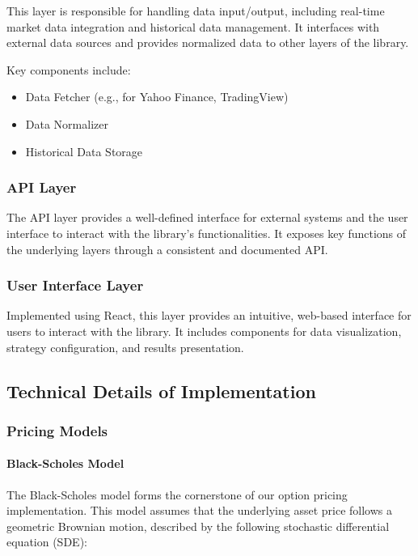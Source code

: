 \documentclass[12pt]{article}
\begin{document}
This layer is responsible for handling data input/output, including real-time market data integration and historical data management. It interfaces with external data sources and provides normalized data to other layers of the library.

Key components include:

\begin{itemize}
    \item Data Fetcher (e.g., for Yahoo Finance, TradingView)
    \item Data Normalizer
    \item Historical Data Storage
\end{itemize}

\subsubsection{API Layer}

The API layer provides a well-defined interface for external systems and the user interface to interact with the library's functionalities. It exposes key functions of the underlying layers through a consistent and documented API.

\subsubsection{User Interface Layer}

Implemented using React, this layer provides an intuitive, web-based interface for users to interact with the library. It includes components for data visualization, strategy configuration, and results presentation.

\subsection{Technical Details of Implementation}

\subsubsection{Pricing Models}

\paragraph{Black-Scholes Model}

The Black-Scholes model forms the cornerstone of our option pricing implementation. This model assumes that the underlying asset price follows a geometric Brownian motion, described by the following stochastic differential equation (SDE):
\end{document}
